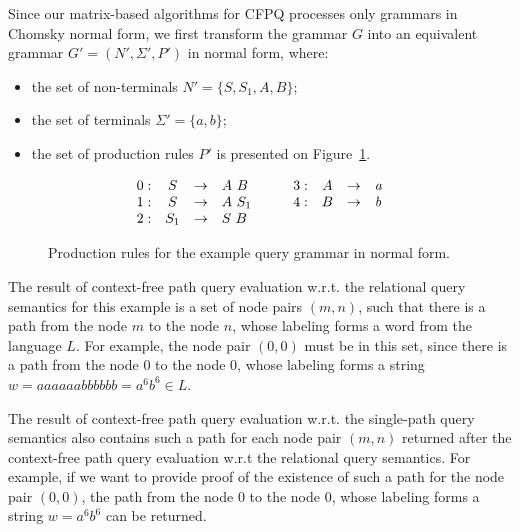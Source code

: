 Since our matrix-based algorithms for CFPQ processes only grammars in Chomsky normal form, we first transform the grammar $G$ into an equivalent grammar $G' = (N', \Sigma', P')$ in normal form, where:
\begin{itemize}
	\item the set of non-terminals $N' = \{S, S_1, A, B\}$;
	\item the set of terminals $\Sigma' = \{a, b\}$;
	\item the set of production rules $P'$ is presented on Figure~\ref{ProductionRulesExampleQueryCNF}.
\end{itemize}

\begin{figure}[h]
	\[
	\begin{array}{rcclcrccl}
	0: & S & \rightarrow & A \ B   & \quad & 3: & A & \rightarrow & \text{\emph{a}}     \\
	1: & S & \rightarrow & A \ S_1       & \quad & 4: & B & \rightarrow & \text{\emph{b}} \\
	2: & S_1 & \rightarrow & S \ B & & & & &
	
	\end{array}
	\]
	\caption{Production rules for the example query grammar in normal form.}
	\label{ProductionRulesExampleQueryCNF}
\end{figure}

The result of context-free path query evaluation w.r.t. the relational query semantics for this example is a set of node pairs \mbox{$(m, n)$}, such that there is a path from the node $m$ to the node $n$, whose labeling forms a word from the language $L$. For example, the node pair \mbox{$(0,0)$} must be in this set, since there is a path from the node $0$ to the node $0$, whose labeling forms a string \mbox{$w = aaaaaabbbbbb = a^6b^6 \in L$}.

The result of context-free path query evaluation w.r.t. the single-path query semantics also contains such a path for each node pair \mbox{$(m, n)$} returned after the context-free path query evaluation w.r.t the relational query semantics. For example, if we want to provide proof of the existence of such a path for the node pair \mbox{$(0,0)$}, the path from the node $0$ to the node $0$, whose labeling forms a string \mbox{$w = a^6b^6$} can be returned. 